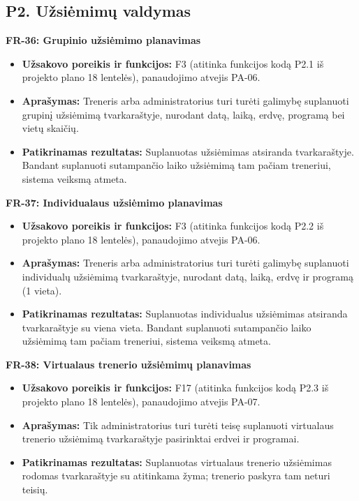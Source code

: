 \subsection{P2. Užsiėmimų valdymas}

\vspace{0.3cm}
\noindent\textbf{FR-36: Grupinio užsiėmimo planavimas}
\begin{itemize}
    \item \textbf{Užsakovo poreikis ir funkcijos:} F3 (atitinka funkcijos kodą P2.1 iš projekto plano 18 lentelės), panaudojimo atvejis PA-06.
    \item \textbf{Aprašymas:} Treneris arba administratorius turi turėti galimybę suplanuoti grupinį užsiėmimą tvarkaraštyje, nurodant datą, laiką, erdvę, programą bei vietų skaičių.
    \item \textbf{Patikrinamas rezultatas:} Suplanuotas užsiėmimas atsiranda tvarkaraštyje. Bandant suplanuoti sutampančio laiko užsiėmimą tam pačiam treneriui, sistema veiksmą atmeta.
\end{itemize}

\vspace{0.3cm}
\noindent\textbf{FR-37: Individualaus užsiėmimo planavimas}
\begin{itemize}
    \item \textbf{Užsakovo poreikis ir funkcijos:} F3 (atitinka funkcijos kodą P2.2 iš projekto plano 18 lentelės), panaudojimo atvejis PA-06.
    \item \textbf{Aprašymas:} Treneris arba administratorius turi turėti galimybę suplanuoti individualų užsiėmimą tvarkaraštyje, nurodant datą, laiką, erdvę ir programą (1 vieta).
    \item \textbf{Patikrinamas rezultatas:} Suplanuotas individualus užsiėmimas atsiranda tvarkaraštyje su viena vieta. Bandant suplanuoti sutampančio laiko užsiėmimą tam pačiam treneriui, sistema veiksmą atmeta.
\end{itemize}

\vspace{0.3cm}
\noindent\textbf{FR-38: Virtualaus trenerio užsiėmimų planavimas}
\begin{itemize}
    \item \textbf{Užsakovo poreikis ir funkcijos:} F17 (atitinka funkcijos kodą P2.3 iš projekto plano 18 lentelės), panaudojimo atvejis PA-07.
    \item \textbf{Aprašymas:} Tik administratorius turi turėti teisę suplanuoti virtualaus trenerio užsiėmimą tvarkaraštyje pasirinktai erdvei ir programai.
    \item \textbf{Patikrinamas rezultatas:} Suplanuotas virtualaus trenerio užsiėmimas rodomas tvarkaraštyje su atitinkama žyma; trenerio paskyra tam neturi teisių.
\end{itemize}

